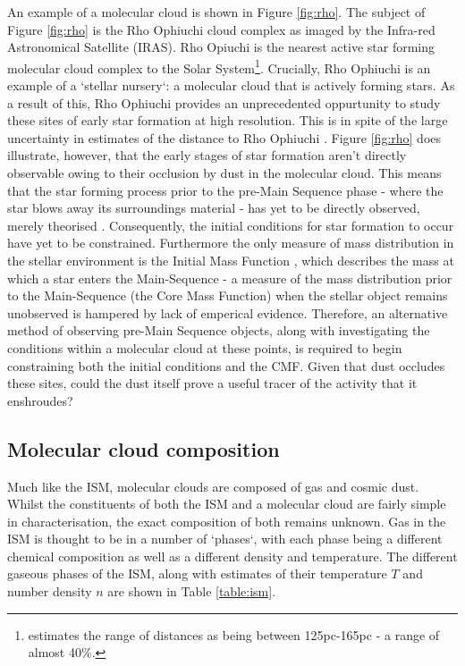 \documentclass{report}
\begin{document}
An example of a molecular cloud is shown in Figure \ref{fig:rho}. The subject of Figure \ref{fig:rho} is the Rho Ophiuchi cloud complex as imaged by the Infra-red Astronomical Satellite (IRAS). Rho Opiuchi is the nearest active star forming molecular cloud complex to the Solar System\footnote{\textcite{rho-dist} estimates the range of distances as being between 125pc-165pc - a range of almost 40\%.}. Crucially, Rho Ophiuchi is an example of a `stellar nursery`: a molecular cloud that is actively forming stars. As a result of this, Rho Ophiuchi provides an unprecedented oppurtunity to study these sites of early star formation at high resolution. This is in spite of the large uncertainty in estimates of the distance to Rho Ophiuchi \parencite{rho-dist}. Figure \ref{fig:rho} does illustrate, however, that the early stages of star formation aren't directly observable owing to their occlusion by dust in the molecular cloud. This means that the star forming process prior to the pre-Main Sequence phase - where the star blows away its surroundings material - has yet to be directly observed, merely theorised \parencite{hayashi}. Consequently, the initial conditions for star formation to occur have yet to be constrained. Furthermore the only measure of mass distribution in the stellar environment is the Initial Mass Function \parencite{imf}, which describes the mass at which a star enters the Main-Sequence - a measure of the mass distribution prior to the Main-Sequence (the Core Mass Function) when the stellar object remains unobserved is hampered by lack of emperical evidence. Therefore, an alternative method of observing pre-Main Sequence objects, along with investigating the conditions within a molecular cloud at these points, is required to begin constraining both the initial conditions and the CMF. Given that dust occludes these sites, could the dust itself prove a useful tracer of the activity that it enshroudes?

\subsection{Molecular cloud composition}
Much like the ISM, molecular clouds are composed of gas and cosmic dust. Whilst the constituents of both the ISM and a molecular cloud are fairly simple in characterisation, the exact composition of both remains unknown. Gas in the ISM is thought to be in a number of `phases`, with each phase being a different chemical composition as well as a different density and temperature. The different gaseous phases of the ISM, along with estimates of their temperature $T$ and number density $n$ are shown in Table \ref{table:ism}.
\end{document}
